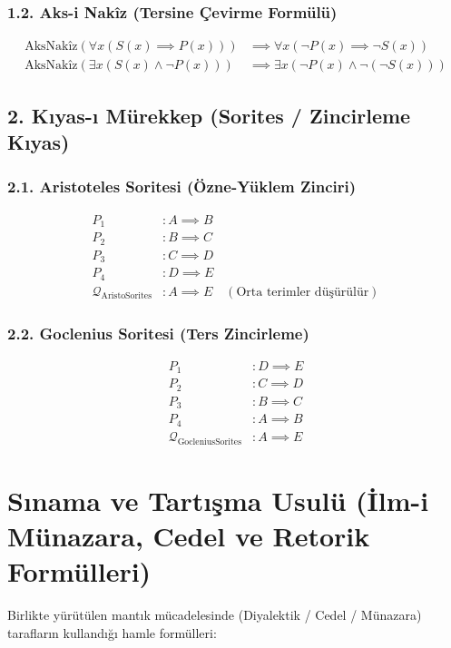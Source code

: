 \documentclass[11pt, a4paper]{article}
\begin{document}
\subsubsection{1.2. Aks-i Nakîz (Tersine Çevirme Formülü)}
\begin{align}
\text{AksNakîz}(\forall x (S(x) \implies P(x))) &\implies \forall x (\neg P(x) \implies \neg S(x)) \\
\text{AksNakîz}(\exists x (S(x) \land \neg P(x))) &\implies \exists x (\neg P(x) \land \neg (\neg S(x)))
\end{align}

\subsection{2. Kıyas-ı Mürekkep (Sorites / Zincirleme Kıyas)}

\subsubsection{2.1. Aristoteles Soritesi (Özne-Yüklem Zinciri)}
\begin{align}
P_1 &: A \implies B \\
P_2 &: B \implies C \\
P_3 &: C \implies D \\
P_4 &: D \implies E \\
\mathcal{Q}_{\text{AristoSorites}} &: A \implies E \quad (\text{Orta terimler düşürülür})
\end{align}

\subsubsection{2.2. Goclenius Soritesi (Ters Zincirleme)}
\begin{align}
P_1 &: D \implies E \\
P_2 &: C \implies D \\
P_3 &: B \implies C \\
P_4 &: A \implies B \\
\mathcal{Q}_{\text{GocleniusSorites}} &: A \implies E
\end{align}

\section{Sınama ve Tartışma Usulü (İlm-i Münazara, Cedel ve Retorik Formülleri)}

Birlikte yürütülen mantık mücadelesinde (Diyalektik / Cedel / Münazara) tarafların kullandığı hamle formülleri:
\end{document}
